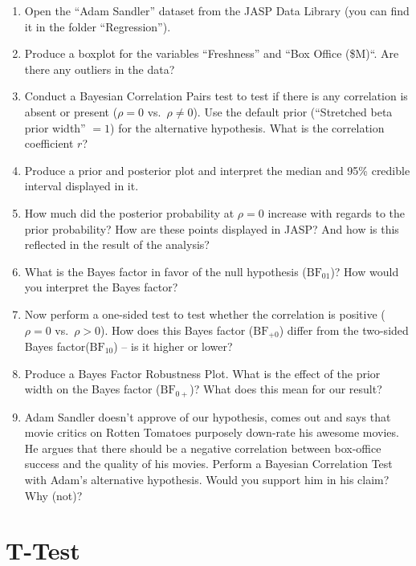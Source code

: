 \documentclass[
  letterpaper,
  DIV=11,
  numbers=noendperiod]{scrreprt}
\providecommand{\tightlist}{%
  \setlength{\itemsep}{0pt}\setlength{\parskip}{0pt}}\usepackage{longtable,booktabs,array}
\begin{document}
\begin{enumerate}
\def\labelenumi{\arabic{enumi}.}
\tightlist
\item
  Open the ``Adam Sandler'' dataset from the JASP Data Library (you can
  find it in the folder ``Regression'').
\item
  Produce a boxplot for the variables ``Freshness'' and ``Box Office
  (\$M)``. Are there any outliers in the data?
\item
  Conduct a Bayesian Correlation Pairs test to test if there is any
  correlation is absent or present (\(\rho = 0\) vs.~\(\rho\neq 0\)).
  Use the default prior (``Stretched beta prior width'' \(= 1\)) for the
  alternative hypothesis. What is the correlation coefficient \(r\)?
\item
  Produce a prior and posterior plot and interpret the median and 95\%
  credible interval displayed in it.\\
\item
  How much did the posterior probability at \(\rho = 0\) increase with
  regards to the prior probability? How are these points displayed in
  JASP? And how is this reflected in the result of the analysis?
\item
  What is the Bayes factor in favor of the null hypothesis
  (\(\text{BF}_{01}\))? How would you interpret the Bayes factor?
\item
  Now perform a one-sided test to test whether the correlation is
  positive (\(\rho = 0\) vs.~\(\rho> 0\)). How does this Bayes factor
  (\(\text{BF}_{+0}\)) differ from the two-sided Bayes
  factor(\(\text{BF}_{10}\)) -- is it higher or lower?
\item
  Produce a Bayes Factor Robustness Plot. What is the effect of the
  prior width on the Bayes factor (\(\text{BF}_{0+}\))? What does this
  mean for our result?
\item
  Adam Sandler doesn't approve of our hypothesis, comes out and says
  that movie critics on Rotten Tomatoes purposely down-rate his awesome
  movies. He argues that there should be a negative correlation between
  box-office success and the quality of his movies. Perform a Bayesian
  Correlation Test with Adam's alternative hypothesis. Would you support
  him in his claim? Why (not)?
\end{enumerate}

\hypertarget{t-test}{%
\section{T-Test}\label{t-test}}
\end{document}

